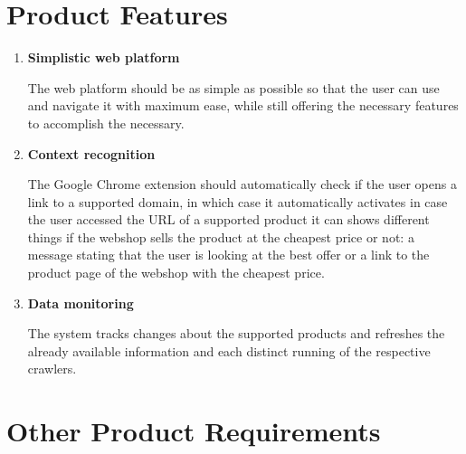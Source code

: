 \documentclass[12pt,a4paper,twoside]{report}
\begin{document}
\section{Product Features}

\begin{enumerate}
  \item \textbf{Simplistic web platform}

        The web platform should be as simple as possible so that the user can use and navigate it with maximum ease, while still offering the necessary features to accomplish the necessary.

  \item \textbf{Context recognition}

        The Google Chrome extension should automatically check if the user opens a link to a supported domain, in which case it automatically activates in case the user accessed the URL of a supported product it can shows different things if the webshop sells the product at the cheapest price or not: a message stating that the user is looking at the best offer or a link to the product page of the webshop with the cheapest price.
\newpage
  \item \textbf{Data monitoring}

        The system tracks changes about the supported products and refreshes the already available information and each distinct running of the respective crawlers.
\end{enumerate}


\section{Other Product Requirements}
\end{document}
